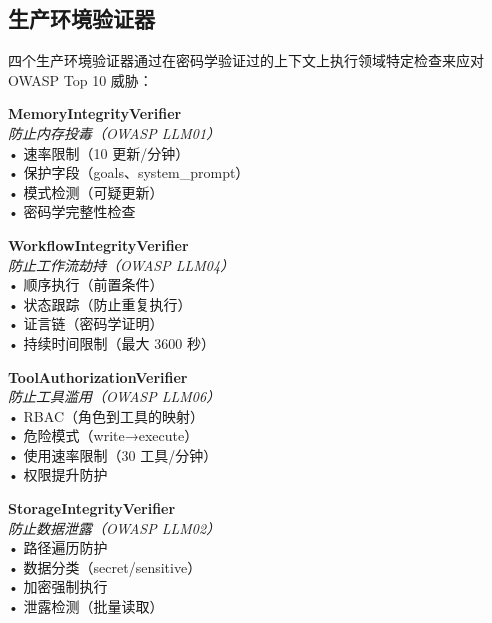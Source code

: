 \subsection*{生产环境验证器}

四个生产环境验证器通过在密码学验证过的上下文上执行领域特定检查来应对 OWASP Top 10 威胁：

{\tiny
\noindent\begin{minipage}[t]{0.48\columnwidth}
\textbf{MemoryIntegrityVerifier}\\
\textit{防止内存投毒（OWASP LLM01）}\\
• 速率限制（10 更新/分钟）\\
• 保护字段（goals、system\_prompt）\\
• 模式检测（可疑更新）\\
• 密码学完整性检查
\end{minipage}
\hfill
\begin{minipage}[t]{0.48\columnwidth}
\textbf{WorkflowIntegrityVerifier}\\
\textit{防止工作流劫持（OWASP LLM04）}\\
• 顺序执行（前置条件）\\
• 状态跟踪（防止重复执行）\\
• 证言链（密码学证明）\\
• 持续时间限制（最大 3600 秒）
\end{minipage}

\vspace{0.5em}

\noindent\begin{minipage}[t]{0.48\columnwidth}
\textbf{ToolAuthorizationVerifier}\\
\textit{防止工具滥用（OWASP LLM06）}\\
• RBAC（角色到工具的映射）\\
• 危险模式（write→execute）\\
• 使用速率限制（30 工具/分钟）\\
• 权限提升防护
\end{minipage}
\hfill
\begin{minipage}[t]{0.48\columnwidth}
\textbf{StorageIntegrityVerifier}\\
\textit{防止数据泄露（OWASP LLM02）}\\
• 路径遍历防护\\
• 数据分类（secret/sensitive）\\
• 加密强制执行\\
• 泄露检测（批量读取）
\end{minipage}
}
